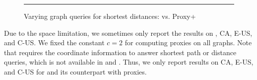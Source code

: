 {\begin{figure}[t!]
\begin{center}
\end{center}
\caption{Varying graph queries  for shortest distances: \ah vs. Proxy+\ah}
\hrule
\label{fig:performance_dist_queries_ah}
\vspace{-2ex}
\end{figure}
}




Due to the space limitation, we sometimes only report the results on \dblpone, CA, E-US, and C-US.
We fixed the constant $c = 2$ for computing proxies on all graphs. Note that \ah requires the coordinate information to answer shortest path or distance queries, which is not available in \dblp and \dblpone. Thus, we only report results on CA, E-US, and C-US for \ah and its counterpart with proxies.




